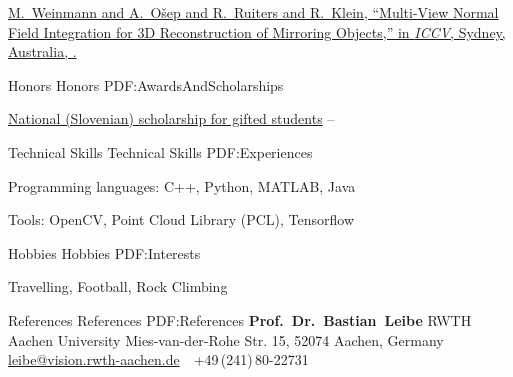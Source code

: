\documentclass[letterpaper,MMMyyyy,nonstopmode]{simpleresumecv}
\begin{document}
\begin{Body}
\Gap
\href{https://www.vision.rwth-aachen.de/media/papers/weinmann_reconstruction_of_mirroring_objects_iccv2013.pdf}
{M.~Weinmann and \underline{A.~Ošep} and R.~Ruiters and R.~Klein,
``Multi-View Normal Field Integration for 3D Reconstruction of Mirroring Objects,''
in \textit{ICCV},
Sydney, Australia,
.}

\endgroup

\Section
{Honors}
{Honors}
{PDF:AwardsAndScholarships}

\Gap
\BulletItem
\href{http://www.sklad-kadri.si/en/scholarships/zois-scholarships/}{National (Slovenian) scholarship for gifted students}
\hfill
{} --
%
%
%
%
%


\Section
{Technical Skills}
{Technical Skills}
{PDF:Experiences}

\BulletItem Programming languages:
C++,
Python,
MATLAB,
Java

\BulletItem Tools:
OpenCV,
Point Cloud Library (PCL),
Tensorflow

\Section
{Hobbies}
{Hobbies}
{PDF:Interests}

\Entry
Travelling,
Football,
Rock Climbing

\Section
{References}
{References}
{PDF:References}
\BulletItem
\textbf{Prof.~Dr.~Bastian~Leibe}
\newline
RWTH Aachen University
\newline
Mies-van-der-Rohe Str. 15, 52074 Aachen, Germany
\newline
\href{mailto:leibe@vision.rwth-aachen.de}
{leibe@vision.rwth-aachen.de}
\,\SubBulletSymbol\,
+49\,(241)\,80-22731
\end{Body}
%
\end{document}
